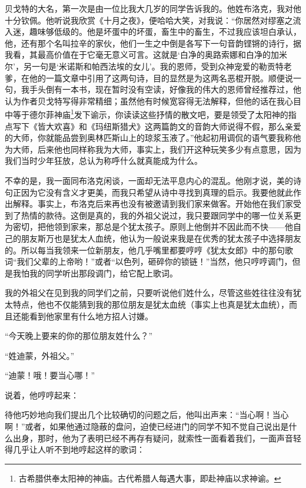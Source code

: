 \par 贝戈特的大名，第一次是由一位比我大几岁的同学告诉我的。他姓布洛克，我对他十分钦佩。他听说我欣赏《十月之夜》，便哈哈大笑，对我说：“你居然对缪塞之流入迷，趣味够低级的。他是坏蛋中的坏蛋，畜生中的畜生，不过我应该坦白承认，他，还有那个名叫拉辛的家伙，他们一生之中倒是各写下一句音韵铿锵的诗行，据我看，其最高价值在于它毫无意义可言。这就是‘白净的奥路索娜和白净的加米尔’，另一句是‘米诺斯和帕西法埃的女儿’。我的恩师，受到众神宠爱的勒贡特老爹，在他的一篇文章中引用了这两句诗，目的显然是为这两名恶棍开脱。顺便说一句，我手头倒有一本书，现在暂时没有空读，好像我的伟大的恩师曾经推荐过，他认为作者贝戈特写得非常精细；虽然他有时候宽容得无法解释，但他的话在我心目中等于德尔菲神庙\footnote{古希腊供奉太阳神的神庙。古代希腊人每遇大事，即赴神庙以求神谕。}发下谕示，你读读这些抒情的散文吧，要是领受了太阳神的指点写下《皆大欢喜》和《玛纽斯猎犬》这两篇韵文的音韵大师说得不假，那么亲爱的大师，你就能品尝到奥林匹斯山上的琼浆玉液了。”他起初用调侃的语气要我称他为大师，后来他也同样称我为大师，事实上，我们开这种玩笑多少有点意思，因为我们当时少年狂放，总认为称呼什么就真能成为什么。
\par 不幸的是，我一面同布洛克闲谈，一面却无法平息内心的混乱。他刚才说，美的诗句正因为它没有含义才更美，而我只希望从诗中寻找到真理的启示。我要他就此作出解释。事实上，布洛克后来再也没有被邀请到我们家来做客。开始他在我们家受到了热情的款待。这倒是真的，我的外祖父说过，我只要跟同学中的哪一位关系更为密切，把他领到家来，那总是个犹太孩子。原则上他倒并不因此而不快——他自己的朋友斯万也是犹太人血统，他认为一般说来我是在优秀的犹太孩子中选择朋友的。所以每当我领来一位新朋友，他几乎嘴里都要哼哼《犹太女郎》中的那句歌词“我们父辈的上帝哟！”或者“以色列，砸碎你的锁链！”当然，他只哼哼调门，但是我怕我的同学听出那段调门，给它配上歌词。
\par 我的外祖父在见到我的同学们之前，只要听说他们姓什么，尽管这些姓往往没有犹太特点，他也不仅能猜到我的那位朋友是犹太血统（事实上也真是犹太血统），而且还能看到他家里有什么地方招人讨嫌。
\par “今天晚上要来的你的那位朋友姓什么？”
\par “姓迪蒙，外祖父。”
\par “迪蒙！哦！要当心哪！”
\par 说着，他哼哼起来：
\par 待他巧妙地向我们提出几个比较确切的问题之后，他叫出声来：“当心啊！当心啊！”或者，如果他通过隐蔽的盘问，迫使已经进门的同学不知不觉自己说出是什么出身，那时，他为了表明已经不再存有疑问，就索性一面看着我们，一面声音轻得几乎让人听不到地哼起这样的歌词：
